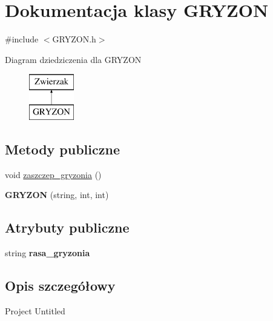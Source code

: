 \hypertarget{class_g_r_y_z_o_n}{}\section{Dokumentacja klasy G\+R\+Y\+Z\+ON}
\label{class_g_r_y_z_o_n}


{\ttfamily \#include $<$G\+R\+Y\+Z\+O\+N.\+h$>$}

Diagram dziedziczenia dla G\+R\+Y\+Z\+ON\begin{figure}[H]
\begin{center}
\leavevmode
\includegraphics[height=2.000000cm]{class_g_r_y_z_o_n}
\end{center}
\end{figure}
\subsection*{Metody publiczne}
\begin{DoxyCompactItemize}
\item 
void \hyperlink{class_g_r_y_z_o_n_a4babc7ea34792cabce0ef8808f2d6a3f}{zaszczep\+\_\+gryzonia} ()
\item 
{\bfseries G\+R\+Y\+Z\+ON} (string, int, int)\hypertarget{class_g_r_y_z_o_n_a0806976434128749d7f261822432c373}{}\label{class_g_r_y_z_o_n_a0806976434128749d7f261822432c373}

\end{DoxyCompactItemize}
\subsection*{Atrybuty publiczne}
\begin{DoxyCompactItemize}
\item 
string {\bfseries rasa\+\_\+gryzonia}\hypertarget{class_g_r_y_z_o_n_a767bcc23a0f4fee52131c184743b17bf}{}\label{class_g_r_y_z_o_n_a767bcc23a0f4fee52131c184743b17bf}

\end{DoxyCompactItemize}


\subsection{Opis szczegółowy}
Project Untitled 

